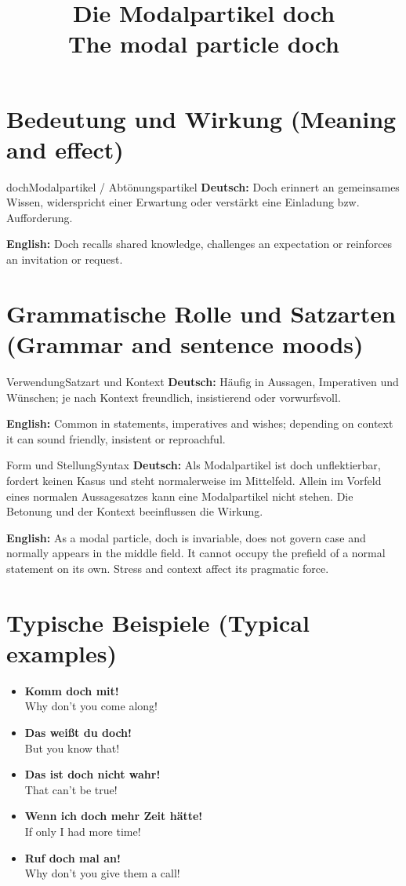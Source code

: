 \documentclass[a4paper,11pt]{article}
\title{Die Modalpartikel \glqq doch\grqq\\{\large\textnormal{The modal particle doch}}}
\date{}
\newcommand{\GermanText}[1]{\textbf{Deutsch: }#1\par}
\newcommand{\EnglishText}[1]{{\small\color{SoftGray}\textbf{English: }#1\par}}
\newcommand{\ExampleItem}[2]{\item \textbf{#1}\\{\small\color{SoftGray}#2}}
\begin{document}
\maketitle
\tableofcontents
\section{Bedeutung und Wirkung \textnormal{(Meaning and effect)}}
\begin{grammarentry}{doch}{Modalpartikel / Abtönungspartikel}
\GermanText{Doch erinnert an gemeinsames Wissen, widerspricht einer Erwartung oder verstärkt eine Einladung bzw. Aufforderung.}
\EnglishText{Doch recalls shared knowledge, challenges an expectation or reinforces an invitation or request.}
\end{grammarentry}
\section{Grammatische Rolle und Satzarten \textnormal{(Grammar and sentence moods)}}
\begin{grammarentry}{Verwendung}{Satzart und Kontext}
\GermanText{Häufig in Aussagen, Imperativen und Wünschen; je nach Kontext freundlich, insistierend oder vorwurfsvoll.}
\EnglishText{Common in statements, imperatives and wishes; depending on context it can sound friendly, insistent or reproachful.}
\end{grammarentry}
\begin{grammarentry}{Form und Stellung}{Syntax}
\GermanText{Als Modalpartikel ist doch unflektierbar, fordert keinen Kasus und steht normalerweise im Mittelfeld. Allein im Vorfeld eines normalen Aussagesatzes kann eine Modalpartikel nicht stehen. Die Betonung und der Kontext beeinflussen die Wirkung.}
\EnglishText{As a modal particle, doch is invariable, does not govern case and normally appears in the middle field. It cannot occupy the prefield of a normal statement on its own. Stress and context affect its pragmatic force.}
\end{grammarentry}
\section{Typische Beispiele \textnormal{(Typical examples)}}
\begin{exbox}\begin{itemize}
\ExampleItem{Komm doch mit!}{Why don't you come along!}
\ExampleItem{Das weißt du doch!}{But you know that!}
\ExampleItem{Das ist doch nicht wahr!}{That can't be true!}
\ExampleItem{Wenn ich doch mehr Zeit hätte!}{If only I had more time!}
\ExampleItem{Ruf doch mal an!}{Why don't you give them a call!}
\end{itemize}\end{exbox}
\end{document}
